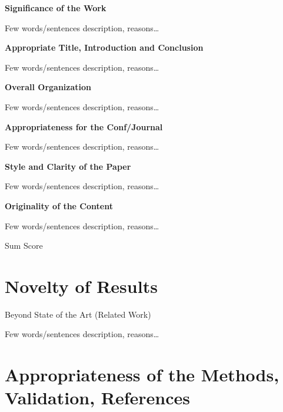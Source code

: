 \documentclass[a4paper,12pt]{article}
\begin{document}

\textbf{Significance of the Work}

Few words/sentences description, reasons\dots  %
\bigskip


\textbf{Appropriate Title, Introduction and Conclusion}

Few words/sentences description, reasons\dots  %
\bigskip


\textbf{Overall Organization}

Few words/sentences description, reasons\dots  %
\bigskip


\textbf{Appropriateness for the Conf/Journal}

Few words/sentences description, reasons\dots  %
\bigskip


\textbf{Style and Clarity of the Paper}

Few words/sentences description, reasons\dots  %
\bigskip


\textbf{Originality of the Content}

Few words/sentences description, reasons\dots  %
\bigskip


{\Large Sum Score } %


\section{Novelty of Results}

Beyond State of the Art (Related Work)

Few words/sentences description, reasons\dots  %


\section{Appropriateness of the Methods,\\ Validation, References}
\end{document}
